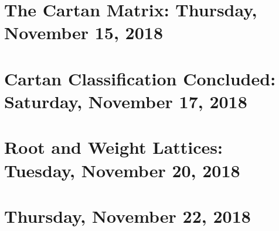\documentclass[reqno]{amsart}
\begin{document}
\section{The Cartan Matrix: Thursday, November 15, 2018}
    
\section{Cartan Classification Concluded: Saturday, November 17, 2018}
    
\section{Root and Weight Lattices: Tuesday, November 20, 2018}
    
\section{Thursday, November 22, 2018}
    
\end{document}

